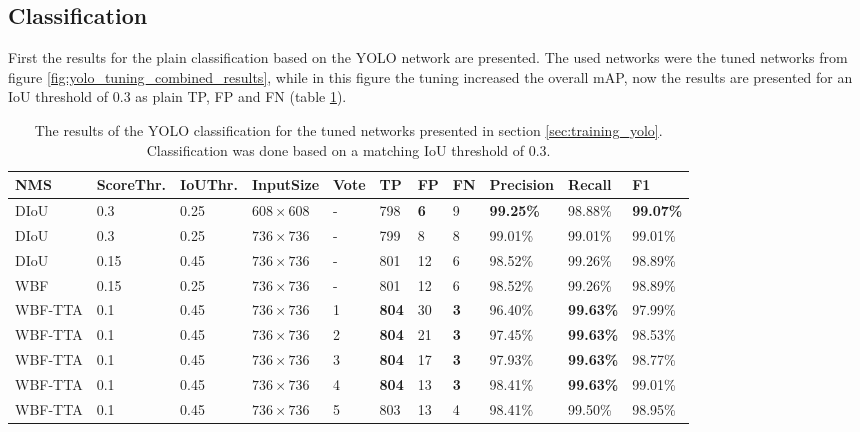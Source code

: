 \subsection{Classification}
First the results for the plain classification based on the \ac{YOLO} network are presented.
The used networks were the tuned networks from figure \ref{fig:yolo_tuning_combined_results}, while in this figure the tuning increased the overall \ac{mAP}, now the results are presented for an \ac{IoU} threshold of 0.3 as plain \ac{TP}, \ac{FP} and \ac{FN} (table \ref{tab:yolo_classification_res}).

\begin{table}[H]
\footnotesize
\begin{center}
\begin{tabular}{|l|l|l|l|l|l|l|l|l|l|l|}

\hline
\textbf{NMS} & \textbf{ScoreThr.} & \textbf{IoUThr.} & \textbf{InputSize} & \textbf{Vote} & \textbf{TP}  & \textbf{FP} & \textbf{FN} & \textbf{Precision} & \textbf{Recall}  & \textbf{F1}       \\
\hline
DIoU    & 0.3        & 0.25     & $608 \times 608$   & -     & 798 & \textbf{6}  & 9  & \textbf{99.25\%}   & 98.88\% & \textbf{99.07\%}  \\
\hline
DIoU    & 0.3        & 0.25     & $736  \times 736$  & -     & 799 & 8  & 8  & 99.01\%   & 99.01\% & 99.01\%  \\
\hline
DIoU    & 0.15       & 0.45     & $736  \times 736$  & -     & 801 & 12 & 6  & 98.52\%   & 99.26\% & 98.89\%  \\
\hline
WBF     & 0.15       & 0.25     & $736  \times 736$  & -     & 801 & 12 & 6  & 98.52\%   & 99.26\% & 98.89\%  \\
\hline
WBF-TTA & 0.1        & 0.45     & $736  \times 736$  & 1     & \textbf{804} & 30 & \textbf{3}  & 96.40\%   & \textbf{99.63\%} & 97.99\%  \\
\hline
WBF-TTA & 0.1        & 0.45     & $736  \times 736$  & 2     & \textbf{804} & 21 & \textbf{3}  & 97.45\%   & \textbf{99.63\%} & 98.53\%  \\
\hline
WBF-TTA & 0.1        & 0.45     & $736  \times 736$  & 3     & \textbf{804} & 17 & \textbf{3}  & 97.93\%   & \textbf{99.63\%} & 98.77\%  \\
\hline
WBF-TTA & 0.1        & 0.45     & $736  \times 736$  & 4     & \textbf{804} & 13 & \textbf{3}  & 98.41\%   & \textbf{99.63\%} & 99.01\%  \\
\hline
WBF-TTA & 0.1        & 0.45     & $736  \times 736$  & 5     & 803 & 13 & 4  & 98.41\%   & 99.50\% & 98.95\%  \\
\hline

\end{tabular}
\caption{The results of the YOLO classification for the tuned networks presented in section \ref{sec:training_yolo}. Classification was done based on a matching \ac{IoU} threshold of 0.3.}
\label{tab:yolo_classification_res}
\end{center}
\end{table}

